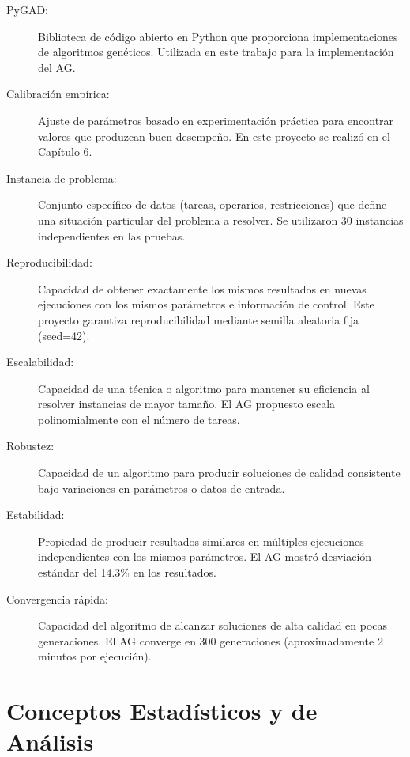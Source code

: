 \begin{description}
    \item[PyGAD:] Biblioteca de código abierto en Python que proporciona implementaciones de algoritmos genéticos. Utilizada en este trabajo para la implementación del AG.
    
    \item[Calibración empírica:] Ajuste de parámetros basado en experimentación práctica para encontrar valores que produzcan buen desempeño. En este proyecto se realizó en el Capítulo 6.
    
    \item[Instancia de problema:] Conjunto específico de datos (tareas, operarios, restricciones) que define una situación particular del problema a resolver. Se utilizaron 30 instancias independientes en las pruebas.
    
    \item[Reproducibilidad:] Capacidad de obtener exactamente los mismos resultados en nuevas ejecuciones con los mismos parámetros e información de control. Este proyecto garantiza reproducibilidad mediante semilla aleatoria fija (seed=42).
    
    \item[Escalabilidad:] Capacidad de una técnica o algoritmo para mantener su eficiencia al resolver instancias de mayor tamaño. El AG propuesto escala polinomialmente con el número de tareas.
    
    \item[Robustez:] Capacidad de un algoritmo para producir soluciones de calidad consistente bajo variaciones en parámetros o datos de entrada.
    
    \item[Estabilidad:] Propiedad de producir resultados similares en múltiples ejecuciones independientes con los mismos parámetros. El AG mostró desviación estándar del 14.3\% en los resultados.
    
    \item[Convergencia rápida:] Capacidad del algoritmo de alcanzar soluciones de alta calidad en pocas generaciones. El AG converge en 300 generaciones (aproximadamente 2 minutos por ejecución).
\end{description}

\section*{Conceptos Estadísticos y de Análisis}

